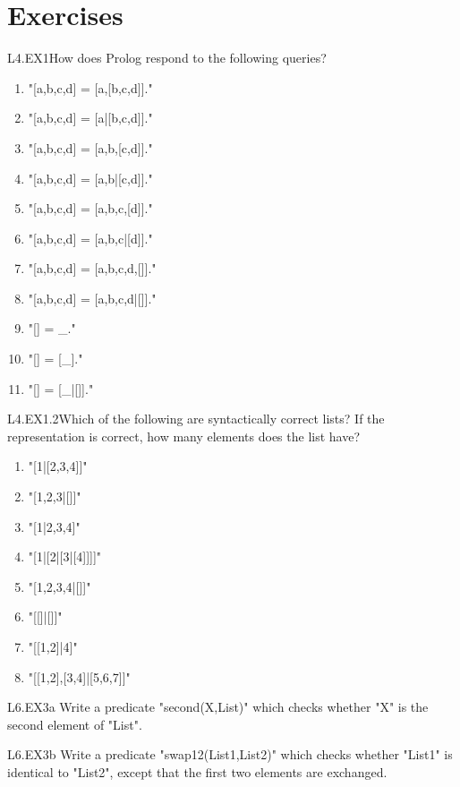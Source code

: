 \section{Exercises}\label{SEC.L4.EXERCISES}

\begin{LPNexercise}{L4.EX1}How does Prolog respond to the following queries?
\begin{enumerate}
\item{}"[a,b,c,d] = [a,[b,c,d]]."
\item{}"[a,b,c,d] = [a|[b,c,d]]."
\item{}"[a,b,c,d] = [a,b,[c,d]]."
\item{}"[a,b,c,d] = [a,b|[c,d]]."
\item{}"[a,b,c,d] = [a,b,c,[d]]."
\item{}"[a,b,c,d] = [a,b,c|[d]]."
\item{}"[a,b,c,d] = [a,b,c,d,[]]."
\item{}"[a,b,c,d] = [a,b,c,d|[]]."
\item{}"[] = _."
\item{}"[] = [_]."
\item{}"[] = [_|[]]."
\end{enumerate}
\end{LPNexercise}
\begin{LPNexercise}{L4.EX1.2}Which of the following are syntactically correct lists? If the representation is correct, how many elements does the list have?

\begin{enumerate}
\item{}"[1|[2,3,4]]"
\item{}"[1,2,3|[]]"
\item{}"[1|2,3,4]"


\item{}"[1|[2|[3|[4]]]]"
\item{}"[1,2,3,4|[]]"
\item{}"[[]|[]]"
\item{}"[[1,2]|4]"
\item{}"[[1,2],[3,4]|[5,6,7]]"


\end{enumerate}
\end{LPNexercise}


\begin{LPNexercise}{L6.EX3a}
Write a predicate "second(X,List)" which checks
whether "X" is the second element of "List".
\end{LPNexercise}


\begin{LPNexercise}{L6.EX3b}
Write a predicate "swap12(List1,List2)" which checks
whether "List1" is identical to "List2", except that the
first two elements are exchanged.
\end{LPNexercise}


